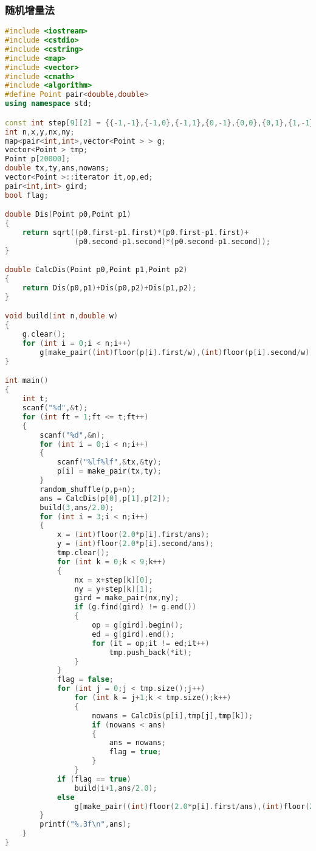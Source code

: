     \subsubsection{随机增量法}
	\begin{lstlisting}[language=c++]
#include <iostream>
#include <cstdio>
#include <cstring>
#include <map>
#include <vector>
#include <cmath>
#include <algorithm>
#define Point pair<double,double>
using namespace std;

const int step[9][2] = {{-1,-1},{-1,0},{-1,1},{0,-1},{0,0},{0,1},{1,-1},{1,0},{1,1}};
int n,x,y,nx,ny;
map<pair<int,int>,vector<Point > > g;
vector<Point > tmp;
Point p[20000];
double tx,ty,ans,nowans;
vector<Point >::iterator it,op,ed;
pair<int,int> gird;
bool flag;

double Dis(Point p0,Point p1)
{
    return sqrt((p0.first-p1.first)*(p0.first-p1.first)+
                (p0.second-p1.second)*(p0.second-p1.second));
}

double CalcDis(Point p0,Point p1,Point p2)
{
    return Dis(p0,p1)+Dis(p0,p2)+Dis(p1,p2);
}

void build(int n,double w)
{
    g.clear();
    for (int i = 0;i < n;i++)
        g[make_pair((int)floor(p[i].first/w),(int)floor(p[i].second/w))].push_back(p[i]);
}

int main()
{
    int t;
    scanf("%d",&t);
    for (int ft = 1;ft <= t;ft++)
    {
        scanf("%d",&n);
        for (int i = 0;i < n;i++)
        {
            scanf("%lf%lf",&tx,&ty);
            p[i] = make_pair(tx,ty);
        }
        random_shuffle(p,p+n);
        ans = CalcDis(p[0],p[1],p[2]);
        build(3,ans/2.0);
        for (int i = 3;i < n;i++)
        {
            x = (int)floor(2.0*p[i].first/ans);
            y = (int)floor(2.0*p[i].second/ans);
            tmp.clear();
            for (int k = 0;k < 9;k++)
            {
                nx = x+step[k][0];
                ny = y+step[k][1];
                gird = make_pair(nx,ny);
                if (g.find(gird) != g.end())
                {
                    op = g[gird].begin();
                    ed = g[gird].end();
                    for (it = op;it != ed;it++)
                        tmp.push_back(*it);
                }
            }
            flag = false;
            for (int j = 0;j < tmp.size();j++)
                for (int k = j+1;k < tmp.size();k++)
                {
                    nowans = CalcDis(p[i],tmp[j],tmp[k]);
                    if (nowans < ans)
                    {
                        ans = nowans;
                        flag = true;
                    }
                }
            if (flag == true)
                build(i+1,ans/2.0);
            else
                g[make_pair((int)floor(2.0*p[i].first/ans),(int)floor(2.0*p[i].second/ans))].push_back(p[i]);
        }
        printf("%.3f\n",ans);
    }
}
	\end{lstlisting}